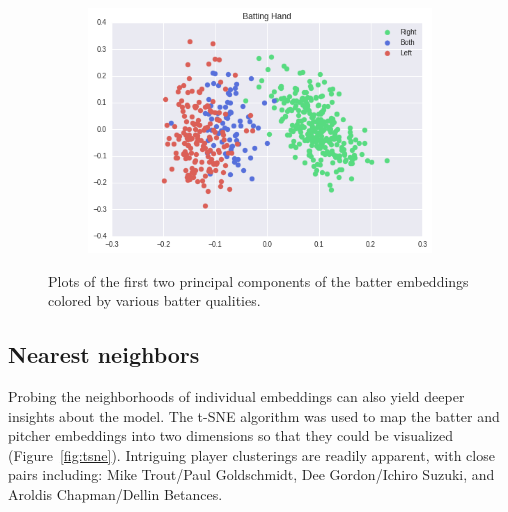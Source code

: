 \documentclass{article}
\begin{document}
\begin{figure}[h]
    \begin{subfigure}{0.5\linewidth}
    \centering
    \includegraphics[width=1\linewidth]{batter_hand.png}
    \caption{}
    \end{subfigure}
\caption{Plots of the first two principal components of the batter embeddings colored by various batter qualities.}
\label{fig:batter_traits}
\end{figure}

\subsection{Nearest neighbors}

Probing the neighborhoods of individual embeddings can also yield deeper insights about the model. The t-SNE algorithm \parencite{VanderMaaten2008} was used to map the batter and pitcher embeddings into two dimensions so that they could be visualized (Figure~\ref{fig:tsne}). Intriguing player clusterings are readily apparent, with close pairs including: Mike Trout/Paul Goldschmidt, Dee Gordon/Ichiro Suzuki, and Aroldis Chapman/Dellin Betances.
\end{document}
